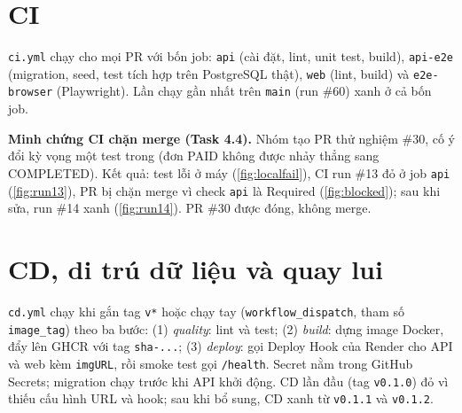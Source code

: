 \section{CI}\label{sec:se-ci}
\texttt{ci.yml} chạy cho mọi PR với bốn job: \texttt{api} (cài đặt, lint, unit test, build), \texttt{api-e2e} (migration, seed, test tích hợp trên PostgreSQL thật), \texttt{web} (lint, build) và \texttt{e2e-browser} (Playwright). Lần chạy gần nhất trên \texttt{main} (run \#60) xanh ở cả bốn job.

\textbf{Minh chứng CI chặn merge (Task 4.4).} Nhóm tạo PR thử nghiệm \#30, cố ý đổi kỳ vọng một test trong  (đơn PAID không được nhảy thẳng sang COMPLETED). Kết quả: test lỗi ở máy (\cref{fig:localfail}), CI run \#13 đỏ ở job \texttt{api} (\cref{fig:run13}), PR bị chặn merge vì check \texttt{api} là Required (\cref{fig:blocked}); sau khi sửa, run \#14 xanh (\cref{fig:run14}). PR \#30 được đóng, không merge.

\section{CD, di trú dữ liệu và quay lui}\label{sec:se-cd}
\texttt{cd.yml} chạy khi gắn tag \texttt{v*} hoặc chạy tay (\texttt{workflow\_dispatch}, tham số \texttt{image\_tag}) theo ba bước: (1) \emph{quality}: lint và test; (2) \emph{build}: dựng image Docker, đẩy lên GHCR với tag \texttt{sha-...}; (3) \emph{deploy}: gọi Deploy Hook của Render cho API và web kèm \texttt{imgURL}, rồi smoke test gọi \texttt{/health}. Secret nằm trong GitHub Secrets; migration chạy trước khi API khởi động. CD lần đầu (tag \texttt{v0.1.0}) đỏ vì thiếu cấu hình URL và hook; sau khi bổ sung, CD xanh từ \texttt{v0.1.1} và \texttt{v0.1.2}.

